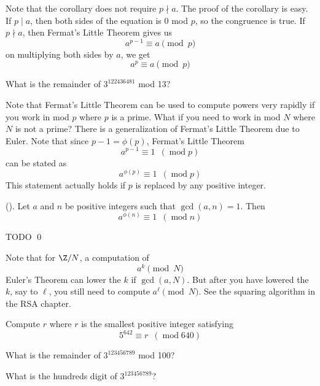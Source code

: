 Note that the corollary does not require $p \nmid a$.
The proof of the corollary is easy.
If $p \mid a$, then both sides of the equation is $0$ mod $p$,
so the congruence is true.
If $p \nmid a$, then Fermat's Little Theorem gives us
\[
a^{p-1} \equiv a \pmod{p}
\]
on multiplying both sides by $a$, we get
\[
a^p \equiv a \pmod{p}
\]

\begin{ex}
What is the remainder of $3^{122436481}$ mod 13?
\end{ex}


Note that Fermat's Little Theorem can be used to compute powers
very rapidly if you work in mod $p$ where $p$ is a prime. What if
you need to work in mod $N$ where $N$ is not a prime? There is a
generalization of Fermat's Little Theorem due to Euler. Note that
since $p-1 = \phi(p)$, Fermat's Little Theorem
\[
 a^{p-1} \equiv 1 \,\,\,(\operatorname{mod} p)
\]
can be stated as
\[
 a^{\phi(p)} \equiv 1 \,\,\,(\operatorname{mod} p)
\]
This statement actually holds if $p$ is replaced by any positive
integer.

\begin{thm} \textnormal{()}.
  Let $a$ and $n$ be positive integers such that $\gcd(a, n) = 1$.
  Then
  \[
  a^{\phi(n)} \equiv 1 \,\,\,(\operatorname{mod} n)
  \]
\end{thm}
\proof
TODO
\qed

Note that for $\Z/N$, a computation of
\[
a^k \pmod{N}
\]
Euler's Theorem can lower the $k$ if $\gcd(a, N)$.
But after you have lowered the $k$, say to $\ell$,
you still need to compute $a^\ell \pmod{N}$.
See the squaring algorithm in the RSA chapter.



\begin{ex}
Compute $r$ where $r$ is the smallest positive integer satisfying
\[
 5^{642} \equiv r \,\,\,(\operatorname{mod} 640)
\]
\end{ex}


\begin{ex}
What is the remainder of $3^{123456789}$ mod 100?
\end{ex}

\begin{ex}
What is the hundreds digit of $3^{123456789}$?
\end{ex}

